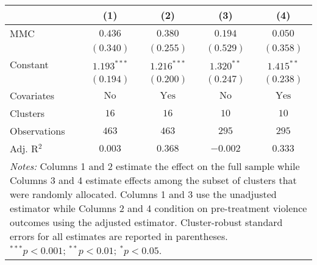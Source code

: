 
\begin{tabular}{l c c c c}
\toprule
 & (1) & (2) & (3) & (4) \\
\midrule
MMC          & $0.436$       & $0.380$        & $0.194$       & $0.050$        \\
             & $(0.340)$     & $(0.255)$      & $(0.529)$     & $(0.358)$      \\
Constant     & $1.193^{***}$ & $1.216^{***}$  & $1.320^{**}$  & $1.415^{**}$   \\
             & $(0.194)$     & $(0.200)$      & $(0.247)$     & $(0.238)$      \\
\midrule
Covariates   & $\textrm{No}$ & $\textrm{Yes}$ & $\textrm{No}$ & $\textrm{Yes}$ \\
Clusters     & $16$          & $16$           & $10$          & $10$           \\
Observations & $463$         & $463$          & $295$         & $295$          \\
Adj. R$^2$   & $0.003$       & $0.368$        & $-0.002$      & $0.333$        \\
\bottomrule
\multicolumn{5}{l}{\scriptsize{\parbox{.5\linewidth}{\vspace{2pt} 
       \textit{Notes:} Columns 1 and 2 estimate the effect on the full sample while Columns 3 
       and 4 estimate effects among the subset of clusters that were randomly allocated.
       Columns 1 and 3 use the unadjusted estimator while Columns 2 and 4 condition on 
       pre-treatment violence outcomes using the adjusted estimator. Cluster-robust 
       standard errors for all estimates are reported in parentheses. \\ $^{***}p<0.001$; $^{**}p<0.01$; $^{*}p<0.05$.}}}
\end{tabular}
